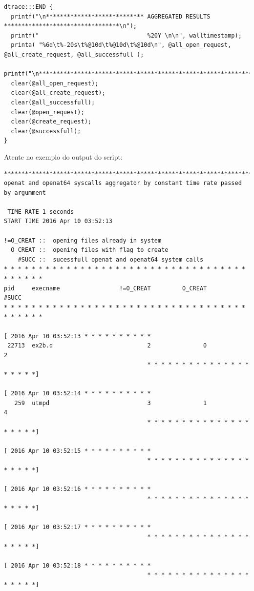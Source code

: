 \documentclass[a4paper]{article}
\begin{document}
\begin{lstlisting}
dtrace:::END {
  printf("\n**************************** AGGREGATED RESULTS *********************************\n");
  printf("                               %20Y \n\n", walltimestamp);
  printa( "%6d\t%-20s\t%@10d\t%@10d\t%@10d\n", @all_open_request, @all_create_request, @all_successfull );
  printf("\n*********************************************************************************\n");
  clear(@all_open_request);
  clear(@all_create_request);
  clear(@all_successfull);
  clear(@open_request);
  clear(@create_request);
  clear(@successfull);
}

 \end{lstlisting}

Atente no exemplo do output do script:

\begin{lstlisting}[basicstyle=\scriptsize]
*********************************************************************************
openat and openat64 syscalls aggregator by constant time rate passed by argumment

 TIME RATE 1 seconds 
START TIME 2016 Apr 10 03:52:13 

!=O_CREAT ::  opening files already in system
  O_CREAT ::  opening files with flag to create
    #SUCC ::  sucessfull openat and openat64 system calls
* * * * * * * * * * * * * * * * * * * * * * * * * * * * * * * * * * * * * * * * *
pid     execname                 !=O_CREAT         O_CREAT           #SUCC
* * * * * * * * * * * * * * * * * * * * * * * * * * * * * * * * * * * * * * * * *

[ 2016 Apr 10 03:52:13 * * * * * * * * * * 
 22713  ex2b.d                           2               0               2
                                         * * * * * * * * * * * * * * * * * * * *]

[ 2016 Apr 10 03:52:14 * * * * * * * * * * 
   259  utmpd                            3               1               4
                                         * * * * * * * * * * * * * * * * * * * *]

[ 2016 Apr 10 03:52:15 * * * * * * * * * * 
                                         * * * * * * * * * * * * * * * * * * * *]

[ 2016 Apr 10 03:52:16 * * * * * * * * * * 
                                         * * * * * * * * * * * * * * * * * * * *]

[ 2016 Apr 10 03:52:17 * * * * * * * * * * 
                                         * * * * * * * * * * * * * * * * * * * *]

[ 2016 Apr 10 03:52:18 * * * * * * * * * * 
                                         * * * * * * * * * * * * * * * * * * * *]


\end{lstlisting}
\end{document}
